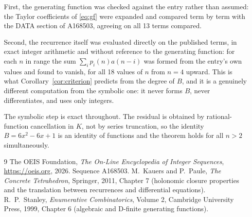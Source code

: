 \documentclass[11pt,a4paper]{article}
\theoremstyle{plain}
\theoremstyle{definition}
\begin{document}
First, the generating function was checked against the entry rather than assumed: the
Taylor coefficients of \eqref{eq:gf} were expanded and compared term by term with the DATA
section of A168503, agreeing on all 13 terms compared.

Second, the recurrence itself was evaluated directly on the published terms, in exact
integer arithmetic and without reference to the generating function: for each $n$ in range
the sum $\sum_{i}p_{i}(n)a(n-i)$ was formed from the entry's own values and found to
vanish, for all 18 values of $n$ from $n=4$ upward. This is what
Corollary~\ref{cor:criterion} predicts from the degree of $B$, and it is a genuinely
different computation from the symbolic one: it never forms $B$, never differentiates, and
uses only integers.

The symbolic step is exact throughout. The residual is obtained by rational-function
cancellation in $K$, not by series truncation, so the identity $B=6 x^{2} - 6 x + 1$ is an
identity of functions and the theorem holds for all $n>2$ simultaneously.

\begin{thebibliography}{9}
 The OEIS Foundation, \emph{The On-Line Encyclopedia of Integer Sequences},
\url{https://oeis.org}, 2026. Sequence A168503.
 M.~Kauers and P.~Paule, \emph{The Concrete Tetrahedron}, Springer, 2011,
Chapter 7 (holonomic closure properties and the translation between recurrences and
differential equations).
 R.~P.~Stanley, \emph{Enumerative Combinatorics}, Volume 2, Cambridge
University Press, 1999, Chapter 6 (algebraic and D-finite generating functions).
\end{thebibliography}
\end{document}
